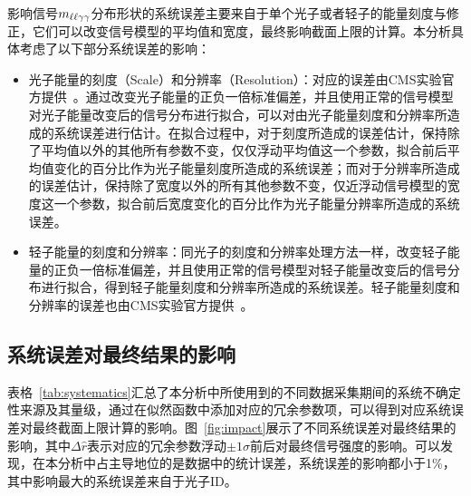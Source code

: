影响信号$m_{\ell\ell\gamma\gamma}$分布形状的系统误差主要来自于单个光子或者轻子的能量刻度与修正，它们可以改变信号模型的平均值和宽度，最终影响截面上限的计算。本分析具体考虑了以下部分系统误差的影响：
\begin{itemize}
    \item 光子能量的刻度（Scale）和分辨率（Resolution）：对应的误差由CMS实验官方提供~\cite{CMS:2020uim}。通过改变光子能量的正负一倍标准偏差，并且使用正常的信号模型对光子能量改变后的信号分布进行拟合，可以对由光子能量刻度和分辨率所造成的系统误差进行估计。在拟合过程中，对于刻度所造成的误差估计，保持除了平均值以外的其他所有参数不变，仅仅浮动平均值这一个参数，拟合前后平均值变化的百分比作为光子能量刻度所造成的系统误差；而对于分辨率所造成的误差估计，保持除了宽度以外的所有其他参数不变，仅近浮动信号模型的宽度这一个参数，拟合前后宽度变化的百分比作为光子能量分辨率所造成的系统误差。
    \item 轻子能量的刻度和分辨率：同光子的刻度和分辨率处理方法一样，改变轻子能量的正负一倍标准偏差，并且使用正常的信号模型对轻子能量改变后的信号分布进行拟合，得到轻子能量刻度和分辨率所造成的系统误差。轻子能量刻度和分辨率的误差也由CMS实验官方提供~\cite{CMS:2020uim,Sirunyan:2018fpa}。
\end{itemize}

\subsection{系统误差对最终结果的影响}

表格~\ref{tab:systematics}汇总了本分析中所使用到的不同数据采集期间的系统不确定性来源及其量级，通过在似然函数中添加对应的冗余参数项，可以得到对应系统误差对最终截面上限计算的影响。图~\ref{fig:impact}展示了不同系统误差对最终结果的影响，其中$\Delta \hat{r}$表示对应的冗余参数浮动$\pm1\sigma$前后对最终信号强度的影响。可以发现，在本分析中占主导地位的是数据中的统计误差，系统误差的影响都小于1\%，其中影响最大的系统误差来自于光子ID。

